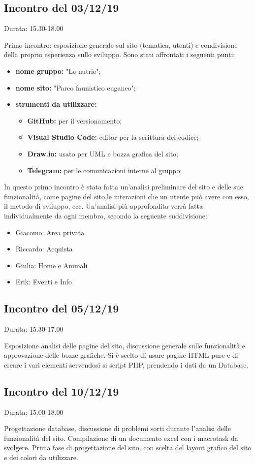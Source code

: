 \subsection{Incontro del 03/12/19}
    Durata: 15.30-18.00

    Primo incontro: esposizione generale sul sito (tematica, utenti) e condivisione della proprio esperienza sullo sviluppo.
    Sono stati affrontati i seguenti punti:
    
    \begin{itemize}
        \item \textbf{nome gruppo:} "Le nutrie"; 
        \item \textbf{nome sito:} "Parco faunistico euganeo"; 
        \item \textbf{strumenti da utilizzare:}
            \begin{itemize}
                \item \textbf{GitHub:} per il versionamento; 
                \item \textbf{Visual Studio Code:} editor per la scrittura del codice; 
                \item \textbf{Draw.io:} usato per UML e bozza grafica del sito;
                \item \textbf{Telegram:} per le comunicazioni interne al gruppo;
            \end{itemize}
    \end{itemize}

    In questo primo incontro è stata fatta un'analisi preliminare del sito e delle sue funzionalità, come pagine del sito,le interazioni che un utente può avere con esso, il metodo di sviluppo, ecc.
    Un'analisi più approfondita verrà fatta individualmente da ogni membro, secondo la seguente suddivisione:
    \begin{itemize}
        \item Giacomo: Area privata
        \item Riccardo: Acquista
        \item Giulia: Home e Animali
        \item Erik: Eventi e Info
    \end{itemize}

\subsection{Incontro del 05/12/19}
    Durata: 15.30-17.00

    Esposizione analisi delle pagine del sito, discussione generale sulle funzionalità e approvazione delle bozze grafiche.
    Si è scelto di usare pagine HTML pure e di creare i vari elementi servendosi si script PHP, prendendo i dati da un Database.

\subsection{Incontro del 10/12/19}
    Durata: 15.00-18.00

    Progettazione database, discussione di problemi sorti durante l'analisi delle funzionalità del sito. Compilazione di un documento excel con i macrotask da svolgere.
    Prima fase di progettazione del sito, con scelta del layout grafico del sito e dei colori da utilizzare.